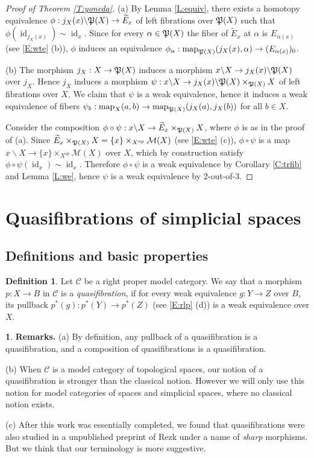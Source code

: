 \documentclass[12pt]{amsart}
\theoremstyle{plain}
\theoremstyle{definition}
\newtheorem{Def}[Thm]{Definition}
\newtheorem{Emp}[Thm]{}
\numberwithin{equation}{section}
\newcommand{\cal}[1]{\mathcal{#1}}
\newcommand{\C}[1]{\cal#1}
\newcommand{\wt}{\widetilde}
\newcommand{\bs}{\backslash}
\newcommand{\al}{\alpha}
\newcommand{\rl}[1]{Lemma \ref{L:#1}}
\newcommand{\re}[1]{\ref{E:#1}}
\newcommand{\rco}[1]{Corollary \ref{C:#1}}
\newcommand{\rt}[1] {Theorem \ref{T:#1}}
\newcommand{\id}{\operatorname{id}}
\newcommand{\map}{\operatorname{map}}
\renewcommand{\P}{\frak{P}}
\begin{document}
\begin{proof}[Proof of \rt{yoneda}]

(a) By \rl{equiv}, there exists a homotopy equivalence
$\phi:j_X(x)\bs \P(X)\to \wt{E}_x$ of left fibrations over $\P(X)$
such that $\phi(\id_{j_X(x)})\sim\id_x$. Since for every
$\al\in\P(X)$ the fiber of $\wt{E}_x$ at $\al$ is $E_{\al(x)}$
(see \re{wte} (b)), $\phi$ induces an equivalence
$\phi_{\al}:\map_{\P(X)}(j_X(x),\al)\to (E_{\al(x)})_0$.

(b) The morphism $j_X:X\to \P(X)$ induces a morphism $x\bs X\to
j_X(x)\bs \P(X)$ over $j_X$.  Hence $j_X$ induces a morphism
$\psi:x\bs X\to j_X(x)\bs\P(X)\times_{\P(X)}X$ of left fibrations
over $X$. We claim that $\psi$ is a weak equivalence, hence it
induces a weak equivalence of fibers
$\psi_b:\map_X(a,b)\to\map_{\P(X)}(j_X(a),j_X(b))$ for all $b\in
X$.

Consider the composition $\phi\circ\psi:x\bs X\to
\wt{E}_x\times_{\P(X)}X$, where $\phi$ is as in the proof of (a).
Since $\wt{E}_x\times_{\P(X)}X=\{x\}\times_{X^{op}}\C{M}(X)$ (see
\re{wte} (c)), $\phi\circ\psi$ is a map $x\bs X\to
\{x\}\times_{X^{op}}\C{M}(X)$ over $X$, which by construction
satisfy $\phi\circ\psi(\id_x)\sim\id_x$. Therefore $\phi\circ\psi$
is a weak equivalence by \rco{trfib} and \rl{we}, hence $\psi$ is
a weak equivalence by 2-out-of-3.
\end{proof}

\section{Quasifibrations of simplicial spaces}
\subsection{Definitions and basic properties}
\begin{Def} \label{D:qfib}
Let ${\C{C}}$ be a right proper model category. We say that a
morphism $p:X\to B$ in ${\C{C}}$ is a {\em quasifibration}, if for
every weak equivalence $g:Y\to Z$ over $B$, its pullback
$p^*(g):p^*(Y)\to p^*(Z)$ (see \re{rlp} (d)) is a weak equivalence over $X$.
\end{Def}

\begin{Emp} \label{E:qfib}
{\bf Remarks.} (a) By definition, any pullback of a quasifibration
is a quasifibration, and a composition of quasifibrations is a
quasifibration.

(b) When ${\C{C}}$ is a model category of topological
spaces, our notion of a quasifibration is stronger than the classical notion. However
we will only use this notion for model categories of spaces and
simplicial spaces, where no classical notion exists.

(c) After this work was essentially completed, we found that quasifibrations were also studied
in a unpublished preprint of Rezk \cite{Re3} under a name of {\em sharp} morphisms. But we think that our
terminology is more suggestive.
\end{Emp}
\end{document}
